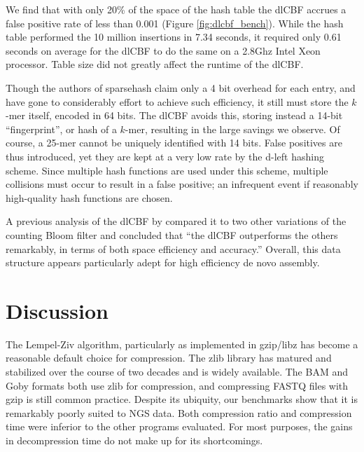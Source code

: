 \documentclass[twocolumn]{article}
\begin{document}
We find that with only 20\% of the space of the hash table the dlCBF accrues a
false positive rate of less than 0.001 (Figure \ref{fig:dlcbf_bench}). While
the hash table performed the 10 million insertions in 7.34 seconds, it
required only 0.61 seconds on average for the dlCBF to do the same on a 2.8Ghz
Intel Xeon processor. Table size did not greatly affect the runtime of the
dlCBF.

Though the authors of sparsehash claim only a 4 bit overhead for each entry,
and have gone to considerably effort to achieve such efficiency, it still must
store the $k$-mer itself, encoded in 64 bits. The dlCBF avoids this, storing
instead a 14-bit ``fingerprint'', or hash of a $k$-mer, resulting in the large
savings we observe. Of course, a 25-mer cannot be uniquely identified with 14
bits. False positives are thus introduced, yet they are kept at a very low
rate by the d-left hashing scheme. Since multiple hash functions are used
under this scheme, multiple collisions must occur to result in a false
positive; an infrequent event if reasonably high-quality hash functions are
chosen.

A previous analysis of the dlCBF by \citet{Zhang2009} compared it to two other
variations of the counting Bloom filter and concluded that ``the dlCBF
outperforms the others remarkably, in terms of both space efficiency and
accuracy.'' Overall, this data structure appears particularly adept for high
efficiency de novo assembly.

\section{Discussion}



The Lempel-Ziv algorithm, particularly as implemented in gzip/libz has become
a reasonable default choice for compression. The zlib library has matured and stabilized
over the course of two decades and is widely available. The BAM and Goby
formats both use zlib for compression, and compressing FASTQ files with gzip
is still common practice. Despite its ubiquity, our benchmarks show that it is
remarkably poorly suited to NGS data. Both compression ratio and compression
time were inferior to the other programs evaluated. For most purposes, the
gains in decompression time do not make up for its shortcomings.
\end{document}
